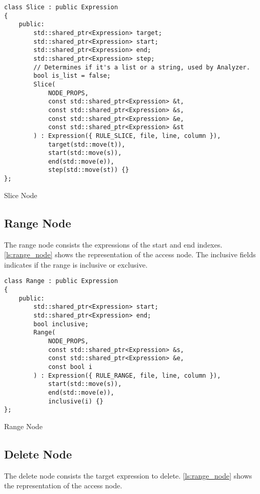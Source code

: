 \begin{listing}[H]
\begin{verbatim}
class Slice : public Expression
{
    public:
        std::shared_ptr<Expression> target;
        std::shared_ptr<Expression> start;
        std::shared_ptr<Expression> end;
        std::shared_ptr<Expression> step;
        // Determines if it's a list or a string, used by Analyzer.
        bool is_list = false;
        Slice(
            NODE_PROPS,
            const std::shared_ptr<Expression> &t,
            const std::shared_ptr<Expression> &s,
            const std::shared_ptr<Expression> &e,
            const std::shared_ptr<Expression> &st
        ) : Expression({ RULE_SLICE, file, line, column }),
            target(std::move(t)),
            start(std::move(s)),
            end(std::move(e)),
            step(std::move(st)) {}
};
\end{verbatim}
\caption{Slice Node}
\label{ls:slice_node}
\end{listing}

\subsection{Range Node}

The range node consists the expressions of the start and end indexes.
\autoref{ls:range_node} shows the representation of the access node.
The inclusive fields indicates if the range is inclusive or exclusive.

\begin{listing}[H]
\begin{verbatim}
class Range : public Expression
{
    public:
        std::shared_ptr<Expression> start;
        std::shared_ptr<Expression> end;
        bool inclusive;
        Range(
            NODE_PROPS,
            const std::shared_ptr<Expression> &s,
            const std::shared_ptr<Expression> &e,
            const bool i
        ) : Expression({ RULE_RANGE, file, line, column }),
            start(std::move(s)),
            end(std::move(e)),
            inclusive(i) {}
};
\end{verbatim}
\caption{Range Node}
\label{ls:range_node}
\end{listing}

\subsection{Delete Node}

The delete node consists the target expression to delete.
\autoref{ls:range_node} shows the representation of the access node.

